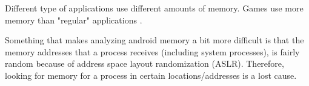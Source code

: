 Different type of applications use different amounts of memory. Games use more memory than "regular" applications \cite{}.

Something that makes analyzing android memory a bit more difficult is that the memory addresses that a process
receives (including system processes), is fairly random because of address space layout randomization (ASLR). Therefore, looking for memory for a process in certain locations/addresses is a lost cause. %



%
%

